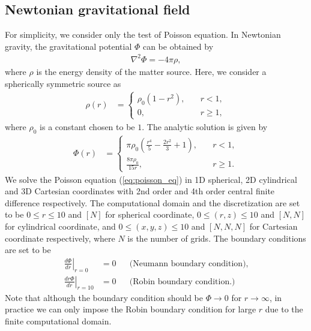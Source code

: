 \subsection{Newtonian gravitational field}
For simplicity, we consider only the test of Poisson equation.
In Newtonian gravity, the gravitational potential $\Phi$ can be obtained by
\begin{align}\label{eq:poisson_eq}
    \nabla^2 \Phi= - 4\pi \rho,
\end{align}
where $\rho$ is the energy density of the matter source.
Here, we consider a spherically symmetric source as
\begin{align}
    \rho(r) &= 
    \begin{cases}
        \rho_0 \left(1-r^2 \right), \quad & r<1,\\
        0, \quad & r\geq 1,
    \end{cases}
\end{align}
where $\rho_0$ is a constant chosen to be $1$.
The analytic solution is given by
\begin{align}
    \Phi(r) &=
    \begin{cases}
        \pi \rho_0 \left(\frac{r^4}{5} - \frac{2 r^2}{3} + 1 \right), \quad & r<1, \\
        \frac{8 \pi \rho_0}{15 r}, \quad & r\geq 1.
    \end{cases}
\end{align}
We solve the Poisson equation (\ref{eq:poisson_eq}) 
in 1D spherical, 2D cylindrical and 3D Cartesian coordinates
with 2nd order and 4th order central finite difference respectively.
The computational domain and the discretization are set to be
$0\leq r \leq 10$ and $[N]$ for spherical coordinate,
$0\leq (r,z) \leq 10$ and $[N,N]$ for cylindrical coordinate, and
$0\leq (x,y,z) \leq 10$ and $[N,N,N]$ for Cartesian coordinate respectively,
where $N$ is the number of grids.
The boundary conditions are set to be
\begin{align}
    \left. \frac{d \Phi}{d r} \right|_{r=0} &= 0 && \text{(Neumann boundary condition)}, \\
    \left. \frac{d r\Phi}{dr} \right|_{r=10} &= 0 && \text{(Robin boundary condition.)}
\end{align}
Note that although the boundary condition should be $\Phi \rightarrow 0$ for $r \rightarrow \infty$,
in practice we can only impose the Robin boundary condition for large $r$ due to the finite computational domain.

